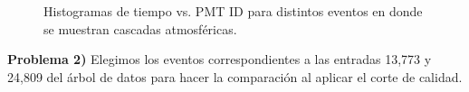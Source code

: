 \documentclass[11pt]{article}
\begin{document}
\begin{figure}[H]

\caption{Histogramas de tiempo vs. PMT ID para distintos eventos en donde se muestran cascadas atmosféricas.}
\label{fig:Prob1}
\end{figure}

\pagebreak
\textbf{Problema 2)}
Elegimos los eventos correspondientes a las entradas 13,773 y 24,809 del árbol de datos para hacer la comparación al aplicar el corte de calidad.
\end{document}
